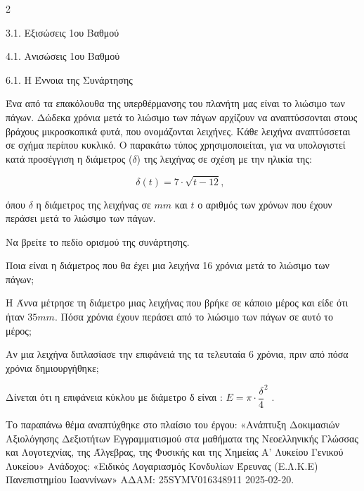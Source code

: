 \begin{ylh}{2}
    \item 3.1. Εξισώσεις 1ου Βαθμού
    \item 4.1. Ανισώσεις 1ου Βαθμού
    \item 6.1. Η Έννοια της Συνάρτησης
\end{ylh}
Ένα από τα επακόλουθα της υπερθέρμανσης του πλανήτη μας είναι το λιώσιμο των πάγων. Δώδεκα χρόνια μετά το λιώσιμο των πάγων αρχίζουν να αναπτύσσονται στους βράχους μικροσκοπικά φυτά, που ονομάζονται λειχήνες. Κάθε λειχήνα αναπτύσσεται σε σχήμα περίπου κυκλικό. Ο παρακάτω τύπος χρησιμοποιείται, για να υπολογιστεί κατά προσέγγιση η διάμετρος ($\delta$) της λειχήνας σε σχέση με την ηλικία της:

\begin{equation*}\delta(t) = 7 \cdot \sqrt{t - 12},\ \ \end{equation*}

όπου $\delta$ η διάμετρος της λειχήνας σε $mm$ και $t$ ο αριθμός των χρόνων που έχουν περάσει μετά το λιώσιμο των πάγων.

\begin{alist}
\item Να βρείτε το πεδίο ορισμού της συνάρτησης.
\item Ποια είναι η διάμετρος που θα έχει μια λειχήνα 16 χρόνια μετά το λιώσιμο των πάγων;
\item Η Άννα μέτρησε τη διάμετρο μιας λειχήνας που βρήκε σε κάποιο μέρος και είδε ότι ήταν $35mm$. Πόσα χρόνια έχουν περάσει από το λιώσιμο των πάγων σε αυτό το μέρος;
\item Αν μια λειχήνα διπλασίασε την επιφάνειά της τα τελευταία 6 χρόνια, πριν από πόσα χρόνια δημιουργήθηκε;


Δίνεται ότι η επιφάνεια κύκλου με διάμετρο δ είναι : $E = \pi \cdot \dfrac{\delta}{4}^{2}$ .

{\footnotesize Το παραπάνω θέμα αναπτύχθηκε στο πλαίσιο του έργου: «Ανάπτυξη Δοκιμασιών Αξιολόγησης Δεξιοτήτων Εγγραμματισμού στα μαθήματα της Νεοελληνικής Γλώσσας και Λογοτεχνίας, της Άλγεβρας, της Φυσικής και της Χημείας Α' Λυκείου Γενικού Λυκείου» Ανάδοχος: «Ειδικός Λογαριασμός Κονδυλίων Έρευνας (Ε.Λ.Κ.Ε) Πανεπιστημίου Ιωαννίνων» ΑΔΑΜ: 25SYMV016348911 2025-02-20.}
\end{alist}

